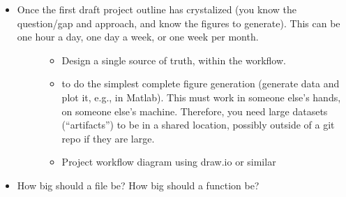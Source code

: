 \documentclass[letterpaper,10pt,english]{sphinxmanual}
\begin{document}
\begin{itemize}
\begin{description}
\begin{itemize}
\item {} 
\sphinxAtStartPar
Thoughtful tree (i.e., folder and subfolder) structure. There are  written on whether to put source in a  directory.

\item {} 
\sphinxAtStartPar
Roughly 20\% of time “refactoring” (improving the code even if it’s working fine as is). An expression from software engineering is “technical debt”, the amount of disorganized clutter that slows future progress. How much time should you spend paying down technical debt (re\sphinxhyphen{}organizing your notes and directory structure, taking notes) versus producing results? This is called “refactoring”. We debated this percent a lot and this is the range that emerged.

\end{itemize}

\end{description}

\item {} \begin{description}
\item[{Once the first draft project outline has crystalized (you know the question/gap and approach, and know the figures to generate). This can be one hour a day, one day a week, or one week per month.}] \leavevmode\begin{itemize}
\item {} 
\sphinxAtStartPar
Design a single source of truth, within the workflow.

\item {} 
\sphinxAtStartPar
{} to do the simplest complete figure generation (generate data and plot it, e.g., in Matlab). This must work in someone else’s hands, on someone else’s machine. Therefore, you need large datasets (“artifacts”) to be in a shared location, possibly outside of a git repo if they are large.

\item {} 
\sphinxAtStartPar
Project workflow diagram using draw.io or similar

\end{itemize}

\end{description}

\item {} \begin{description}
\item[{How big should a file be? How big should a function be?}] \leavevmode
\end{description}

\end{itemize}
\end{document}
